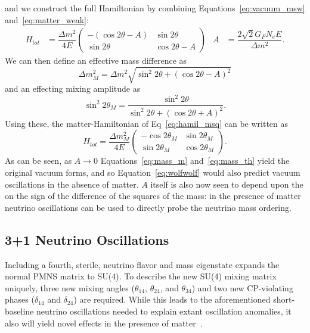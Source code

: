 \documentclass[main.tex]{subfiles}
\begin{document}
and we construct the full Hamiltonian by combining Equations~\eqref{eq:vacuum_msw} and~\eqref{eq:matter_weak}:
\begin{align}\label{eq:hamil_msq}
    H_{tot} &= \dfrac{\Delta m^{2}}{4E}\left(\begin{array}{cc} -(\cos 2\theta - A) & \sin 2\theta \\ \sin 2\theta & \cos 2\theta - A\end{array}\right) & A&= \dfrac{2\sqrt{2} G_{F} N_{e}E}{\Delta m^{2}}.
\end{align}
We can then define an effective mass difference as 
\begin{equation}\label{eq:mass_m}
    \Delta m_{M}^{2} = \Delta m^{2}\sqrt{\sin^{2}2\theta + (\cos 2\theta - A)^{2}}
\end{equation}
and an effecting mixing amplitude as 
\begin{equation}\label{eq:mass_th}
    \sin^{2} 2\theta_{M} = \dfrac{\sin^{2} 2\theta}{\sin^{2} 2\theta + (\cos 2\theta + A)^{2}}.
\end{equation}
Using these, the matter-Hamiltonian of Eq~\eqref{eq:hamil_msq} can be written as 
\begin{equation}\label{eq:wolfwolf}
    H_{tot} = \dfrac{\Delta m_{M}^{2}}{4E}\left(\begin{array}{cc} -\cos 2\theta_{M} & \sin 2\theta_{M} \\ \sin 2\theta_{M} & \cos 2\theta_{M} \end{array} \right).
\end{equation}
As can be seen, as $A\to 0$ Equations~\ref{eq:mass_m} and~\ref{eq:mass_th} yield the original vacuum forms, and so Equation~\ref{eq:wolfwolf} would also predict vacuum oscillations in the absence of matter. 
$A$ itself is also now seen to depend upon the on the sign of the difference of the squares of the mass: in the presence of matter neutrino oscillations can be used to directly probe the neutrino mass ordering. 

\subsection{3+1 Neutrino Oscillations}

Including a fourth, sterile, neutrino flavor and mass eigenstate expands the normal PMNS matrix to SU(4). 
To describe the new SU(4) mixing matrix uniquely, three new mixing angles ($\theta_{14}$, $\theta_{24}$, and $\theta_{34}$) and two new CP-violating phases ($\delta_{14}$ and $\delta_{24}$) are required. 
While this leads to the aforementioned short-baseline neutrino oscillations needed to explain extant oscillation anomalies, it also will yield novel effects in the presence of matter~\cite{Akhmedov:1988kd,KRASTEV1989341,Chizhov:1998ug, Chizhov_1999, Akhmedov_2000}.
\end{document}
